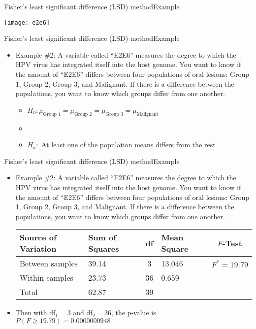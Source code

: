 \documentclass[xcolor=dvipsnames]{beamer}
\begin{document}
\begin{frame}{Fisher's least significant difference (LSD) method}{Example}
	\begin{center}
		\texttt{[image: e2e6]}
	\end{center}
\end{frame}

\begin{frame}{Fisher's least significant difference (LSD) method}{Example}
	\begin{itemize}
		\item Example \#2: A variable called ``E2E6'' measures the degree to which the HPV virus has integrated itself into the host genome. You want to know if the amount of ``E2E6'' differs between four populations of oral lesions: Group 1, Group 2, Group 3, and Malignant. If there is a difference between the populations, you want to know which groups differ from one another.
		\begin{itemize}
			\item $H_0: \mu_{\text{Group 1}} = \mu_{\text{Group 2}} = \mu_{\text{Group 3}} = \mu_{\text{Malignant}}$
			\item[]
			\item $H_a:$ At least one of the population means differs from the rest
		\end{itemize}
	\end{itemize}
\end{frame}  

\begin{frame}{Fisher's least significant difference (LSD) method}{Example}
	\begin{itemize}
		\item Example \#2: A variable called ``E2E6'' measures the degree to which the HPV virus has integrated itself into the host genome. You want to know if the amount of ``E2E6'' differs between four populations of oral lesions: Group 1, Group 2, Group 3, and Malignant. If there is a difference between the populations, you want to know which groups differ from one another.
		\vspace{5mm}
		\begin{center}
			{\scriptsize
				\begin{tabular}{lp{1.2cm}cp{2.5cm}c}
					\hline 
					\textbf{Source of Variation} & \textbf{Sum of Squares} & \textbf{df} & \textbf{Mean Square} & $F$-\textbf{Test} \\ \hline 
					Between samples & 39.14 & 3 & 13.046 & $F^*=19.79$ \\
					Within samples & 23.73 & 36 &  0.659 & \\
					Total & 62.87 & 39 & & \\ \hline
			\end{tabular}}
		\end{center}
		\vspace{5mm}
	\item Then with $\text{df}_1 = 3$ and $\text{df}_2=36$, the p-value is $P(F \geq 19.79) = 0.0000000948$
	\end{itemize}
\end{frame}
\end{document}
